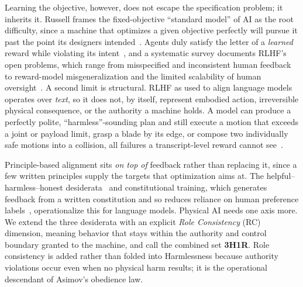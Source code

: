 \documentclass[11pt]{article}
\begin{document}
Learning the objective, however, does not escape the specification problem; it inherits it. Russell frames the fixed-objective ``standard model'' of AI as the root difficulty, since a machine that optimizes a given objective perfectly will pursue it past the point its designers intended~\cite{russell2019}. Agents duly satisfy the letter of a \emph{learned} reward while violating its intent~\cite{amodei2016}, and a systematic survey documents RLHF's open problems, which range from misspecified and inconsistent human feedback to reward-model misgeneralization and the limited scalability of human oversight~\cite{casper2023}. A second limit is structural. RLHF as used to align language models operates over \emph{text}, so it does not, by itself, represent embodied action, irreversible physical consequence, or the authority a machine holds. A model can produce a perfectly polite, ``harmless''-sounding plan and still execute a motion that exceeds a joint or payload limit, grasp a blade by its edge, or compose two individually safe motions into a collision, all failures a transcript-level reward cannot see~\cite{sermanet-asimov,asimov2}.

Principle-based alignment sits \emph{on top of} feedback rather than replacing it, since a few written principles supply the targets that optimization aims at. The helpful--harmless--honest desiderata~\cite{askell2021} and constitutional training, which generates feedback from a written constitution and so reduces reliance on human preference labels~\cite{bai2022}, operationalize this for language models. Physical AI needs one axis more. We extend the three desiderata with an explicit \emph{Role Consistency} (RC) dimension, meaning behavior that stays within the authority and control boundary granted to the machine, and call the combined set \textbf{3H1R}. Role consistency is added rather than folded into Harmlessness because authority violations occur even when no physical harm results; it is the operational descendant of Asimov's obedience law.
\end{document}
